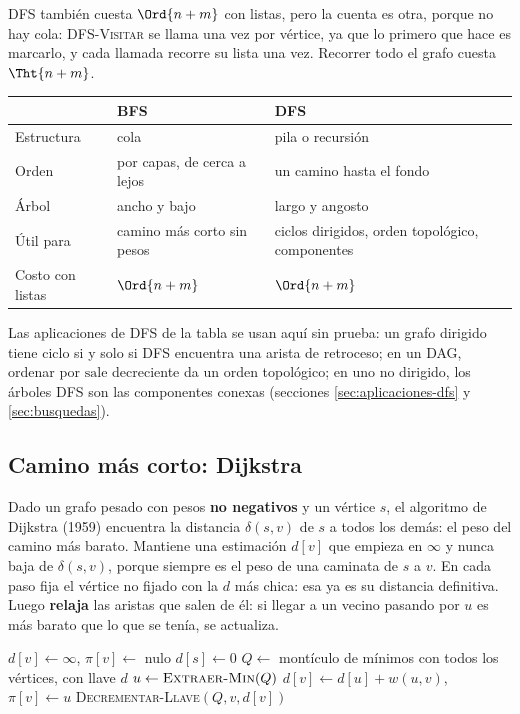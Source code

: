 \documentclass[11pt,letterpaper]{article}
\begin{document}
DFS también cuesta $\Ord{n + m}$ con listas, pero la cuenta es otra,
porque no hay cola: \textsc{DFS-Visitar} se llama una vez por vértice,
ya que lo primero que hace es marcarlo, y cada llamada recorre su
lista una vez. Recorrer todo el grafo cuesta $\Tht{n + m}$.

\begin{center}
\small
\begin{tabular}{lll}
  \toprule
  & \textbf{BFS} & \textbf{DFS} \\
  \midrule
  Estructura & cola & pila o recursión \\
  Orden & por capas, de cerca a lejos & un camino hasta el fondo \\
  Árbol & ancho y bajo & largo y angosto \\
  Útil para & camino más corto sin pesos & ciclos dirigidos, orden
    topológico, componentes \\
  Costo con listas & $\Ord{n + m}$ & $\Ord{n + m}$ \\
  \bottomrule
\end{tabular}
\end{center}

Las aplicaciones de DFS de la tabla se usan aquí sin prueba: un grafo
dirigido tiene ciclo si y solo si DFS encuentra una arista de
retroceso; en un DAG, ordenar por $\text{sale}$ decreciente da un
orden topológico; en uno no dirigido, los árboles DFS son las
componentes conexas (secciones \ref{sec:aplicaciones-dfs} y
\ref{sec:busquedas}).


\subsection*{Camino más corto: Dijkstra}

Dado un grafo pesado con pesos \textbf{no negativos} y un vértice $s$,
el algoritmo de Dijkstra (1959) encuentra la distancia $\delta(s, v)$
de $s$ a todos los demás: el peso del camino más barato. Mantiene una
estimación $d[v]$ que empieza en $\infty$ y nunca baja de
$\delta(s, v)$, porque siempre es el peso de una caminata de $s$ a
$v$. En cada paso fija el vértice no
fijado con la $d$ más chica: esa ya es su distancia definitiva. Luego
\textbf{relaja} las aristas que salen de él: si llegar a un vecino
pasando por $u$ es más barato que lo que se tenía, se actualiza.

\begin{algorithm}[H]
\caption{\textsc{Dijkstra}$(G, w, s)$}
\begin{algorithmic}[1]
  \State $d[v] \gets \infty$, \quad $\pi[v] \gets$ nulo
\EndFor
\State $d[s] \gets 0$
\State $Q \gets$ montículo de mínimos con todos los vértices, con
       llave $d$
  \State $u \gets \textsc{Extraer-Min}(Q)$ 
     
      \State $d[v] \gets d[u] + w(u, v)$, \quad $\pi[v] \gets u$
      \State \textsc{Decrementar-Llave}$(Q, v, d[v])$
    \EndIf
  \EndFor
\EndWhile
\end{algorithmic}
\end{algorithm}
\end{document}
